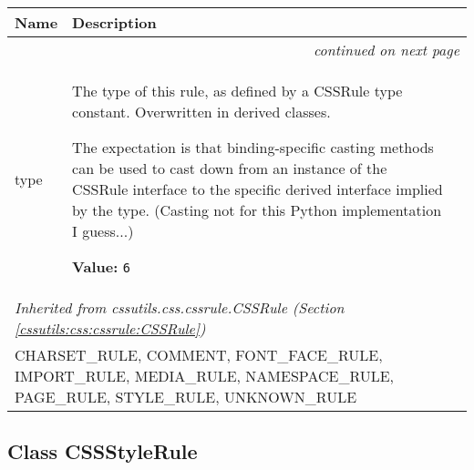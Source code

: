     \vspace{-1cm}
\hspace{\varindent}\begin{longtable}{|p{\varnamewidth}|p{\vardescrwidth}|l}
\cline{1-2}
\cline{1-2} \centering \textbf{Name} & \centering \textbf{Description}& \\
\cline{1-2}
\endhead\cline{1-2}\multicolumn{3}{r}{\small\textit{continued on next page}}\\\endfoot\cline{1-2}
\endlastfoot\raggedright t\-y\-p\-e\- & \raggedright The type of this rule, as defined by a CSSRule type constant.
Overwritten in derived classes.

The expectation is that binding-specific casting methods can be used to
cast down from an instance of the CSSRule interface to the specific
derived interface implied by the type.
(Casting not for this Python implementation I guess...)

\textbf{Value:} 
{\tt 6}&\\
\cline{1-2}
\multicolumn{2}{|l|}{\textit{Inherited from cssutils.css.cssrule.CSSRule \textit{(Section \ref{cssutils:css:cssrule:CSSRule})}}}\\
\multicolumn{2}{|p{\varwidth}|}{\raggedright CHARSET\_RULE, COMMENT, FONT\_FACE\_RULE, IMPORT\_RULE, MEDIA\_RULE, NAMESPACE\_RULE, PAGE\_RULE, STYLE\_RULE, UNKNOWN\_RULE}\\
\cline{1-2}
\end{longtable}



\subsection{Class CSSStyleRule}

